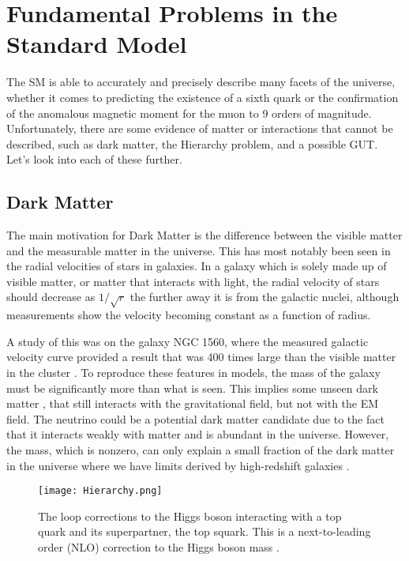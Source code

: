 \section{Fundamental Problems in the Standard Model}
\label{sec:SMIssues}

The SM is able to accurately and precisely describe many facets of the universe, whether it comes to predicting the existence of a sixth quark or the confirmation of the anomalous magnetic moment for the muon to 9 orders of magnitude. Unfortunately, there are some evidence of matter or interactions that cannot be described, such as dark matter, the Hierarchy problem, and a possible GUT. Let's look into each of these further.

\subsection{Dark Matter}
The main motivation for Dark Matter is the difference between the visible matter and the measurable matter in the universe. This has most notably been seen in the radial velocities of stars in galaxies. In a galaxy which is solely made up of visible matter, or matter that interacts with light, the radial velocity of stars should decrease as $1/\sqrt{r}$ the further away it is from the galactic nuclei, although measurements show the velocity becoming constant as a function of radius.

A study of this was on the galaxy NGC 1560, where the measured galactic velocity curve provided a result that was 400 times large than the visible matter in the cluster \cite{broeils_mass_1992}.  To reproduce these features in models, the mass of the galaxy must be significantly more than what is seen. This implies some unseen dark matter \cite{broeils_mass_1992, feng_dark_2010}, that still interacts with the gravitational field, but not with the EM field. The neutrino could be a potential dark matter candidate due to the fact that it interacts weakly with matter and is abundant in the universe. However, the mass, which is nonzero, can only explain a small fraction of the dark matter in the universe where we have limits derived by high-redshift galaxies \cite{bertone_dark_2005}.

\begin{figure}
 	\centering
	\texttt{[image: Hierarchy.png]}
 	\caption[Hierarchy Problem Loop Correction]{The loop corrections to the Higgs boson interacting with a top quark and its superpartner, the top squark. This is a next-to-leading order (NLO) correction to the Higgs boson mass \cite{martin_supersymmetry_1997}.}
 	\label{HiggsMass} 
\end{figure}

